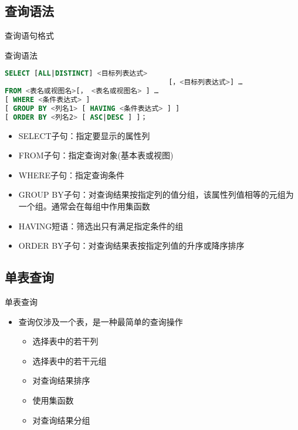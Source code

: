 \subsection{查询语法}
\begin{frame}{查询语句格式}
\begin{block}{查询语法}
\begin{lstlisting}[language=SQL]
SELECT [ALL|DISTINCT] <目标列表达式>
                                       [，<目标列表达式>] …
FROM <表名或视图名>[， <表名或视图名> ] …
[ WHERE <条件表达式> ]
[ GROUP BY <列名1> [ HAVING <条件表达式> ] ]
[ ORDER BY <列名2> [ ASC|DESC ] ]；

\end{lstlisting}
\end{block}
\begin{itemize}
    \item SELECT子句：指定要显示的属性列
    \item FROM子句：指定查询对象(基本表或视图)
    \item WHERE子句：指定查询条件
    \item GROUP BY子句：对查询结果按指定列的值分组，该属性列值相等的元组为一个组。通常会在每组中作用集函数
    \item HAVING短语：筛选出只有满足指定条件的组
    \item ORDER BY子句：对查询结果表按指定列值的升序或降序排序 
\end{itemize}
\end{frame}


\subsection{单表查询}
\begin{frame}[fragile]{单表查询}
\begin{itemize}
    \item 查询仅涉及一个表，是一种最简单的查询操作
    \begin{itemize}
        \item 选择表中的若干列
        \item 选择表中的若干元组
        \item 对查询结果排序
        \item 使用集函数
        \item 对查询结果分组  
    \end{itemize}
\end{itemize}
\end{frame}

